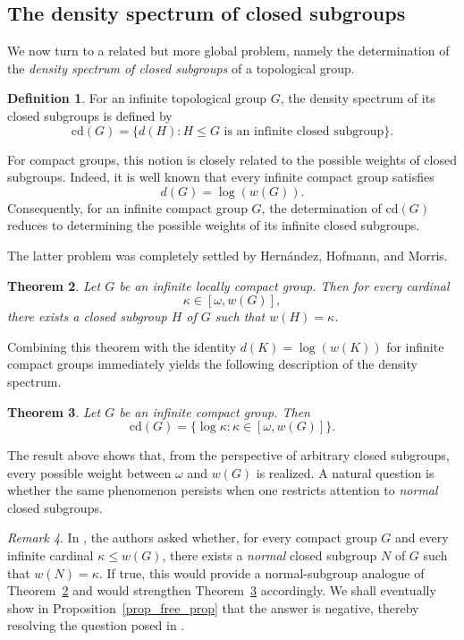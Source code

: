 \documentclass[12pt]{amsart}
\newtheorem{theorem}{Theorem}[section]
\theoremstyle{definition}
\newtheorem{definition}[theorem]{Definition}
\numberwithin{equation}{section}
\theoremstyle{remark}
\newtheorem{remark}[theorem]{Remark}
\def\cd{\mathrm{cd}}
\begin{document}
\subsection{The density spectrum of closed subgroups}

We now turn to a related but more global problem, namely the determination of the \emph{density spectrum of closed subgroups} of a topological group.

\begin{definition}
For an infinite topological group $G$, the density spectrum of its closed subgroups is defined by
\[
\cd(G)=\{d(H): H\leq G \text{ is an infinite closed subgroup}\}.
\]
\end{definition}

For compact groups, this notion is closely related to the possible weights of closed subgroups. Indeed, it is well known that every infinite compact group satisfies
\[
d(G)=\log(w(G)).
\]
Consequently, for an infinite compact group $G$, the determination of $\cd(G)$ reduces to determining the possible weights of its infinite closed subgroups.

The latter problem was completely settled by Hern\'{a}ndez, Hofmann, and Morris.

\begin{theorem}\cite[Main Theorem]{HHM}\label{HHM}
Let $G$ be an infinite locally compact group. Then for every cardinal
\[
\kappa\in[\omega,w(G)],
\]
there exists a closed subgroup $H$ of $G$ such that $w(H)=\kappa$.
\end{theorem}

Combining this theorem with the identity $d(K)=\log(w(K))$ for infinite compact groups immediately yields the following description of the density spectrum.

\begin{theorem}\label{cdk}
Let $G$ be an infinite compact group. Then
\[
\cd(G)=\{\log\kappa:\kappa\in[\omega,w(G)]\}.
\]
\end{theorem}

The result above shows that, from the perspective of arbitrary closed subgroups, every possible weight between $\omega$ and $w(G)$ is realized. A natural question is whether the same phenomenon persists when one restricts attention to \emph{normal} closed subgroups.

\begin{remark}
In \cite[p.~621, Problem]{HHM}, the authors asked whether, for every compact group $G$ and every infinite cardinal $\kappa\leq w(G)$, there exists a \emph{normal} closed subgroup $N$ of $G$ such that
$
w(N)=\kappa.
$
If true, this would provide a normal-subgroup analogue of Theorem~\ref{HHM} and would strengthen Theorem~\ref{cdk} accordingly. We shall eventually show in Proposition~\ref{prop_free_prop} that the answer is negative, thereby resolving the question posed in \cite{HHM}.
\end{remark}
\end{document}

